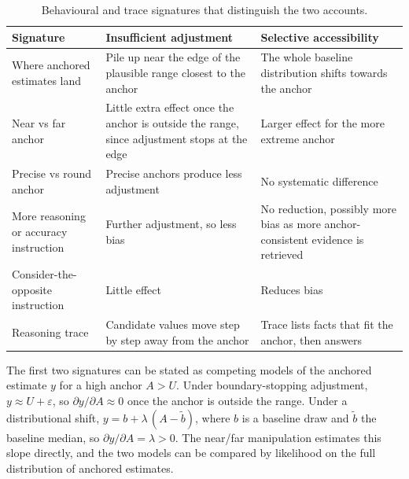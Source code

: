 \documentclass[11pt,a4paper]{article}
\begin{document}
\begin{table}[t]
\centering
\small
\caption{Behavioural and trace signatures that distinguish the two accounts.}
\label{tab:predictions}
\begin{tabularx}{\textwidth}{@{}p{3.2cm}LL@{}}
\toprule
\textbf{Signature} & \textbf{Insufficient adjustment} & \textbf{Selective accessibility} \\
\midrule
Where anchored estimates land & Pile up near the edge of the plausible range closest to the anchor & The whole baseline distribution shifts towards the anchor \\
\addlinespace
Near vs far anchor & Little extra effect once the anchor is outside the range, since adjustment stops at the edge & Larger effect for the more extreme anchor \\
\addlinespace
Precise vs round anchor & Precise anchors produce less adjustment & No systematic difference \\
\addlinespace
More reasoning or accuracy instruction & Further adjustment, so less bias & No reduction, possibly more bias as more anchor-consistent evidence is retrieved \\
\addlinespace
Consider-the-opposite instruction & Little effect & Reduces bias \\
\addlinespace
Reasoning trace & Candidate values move step by step away from the anchor & Trace lists facts that fit the anchor, then answers \\
\bottomrule
\end{tabularx}
\end{table}

The first two signatures can be stated as competing models of the anchored estimate $y$ for a high anchor $A > U$. Under boundary-stopping adjustment, $y \approx U + \varepsilon$, so $\partial y / \partial A \approx 0$ once the anchor is outside the range. Under a distributional shift, $y = b + \lambda\,(A - \tilde{b})$, where $b$ is a baseline draw and $\tilde{b}$ the baseline median, so $\partial y / \partial A = \lambda > 0$. The near/far manipulation estimates this slope directly, and the two models can be compared by likelihood on the full distribution of anchored estimates.
\end{document}
